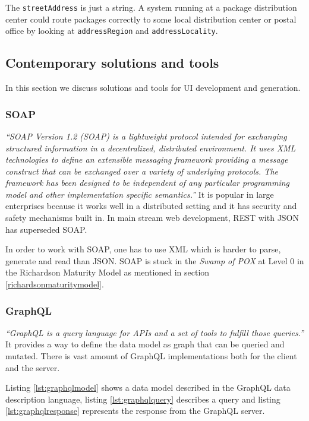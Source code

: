 The \lstinline{streetAddress} is just a string. A system running at a package distribution center could route packages correctly to some local distribution center or postal office by looking at \lstinline{addressRegion} and \lstinline{addressLocality}.

\subsection{Contemporary solutions and tools}\label{sec:contemporarysolutions}
In this section we discuss solutions and tools for UI development and generation.

\subsubsection{SOAP}\label{sec:soap}
\textit{``SOAP Version 1.2 (SOAP) is a lightweight protocol intended for exchanging structured information in a decentralized, distributed environment. It uses XML technologies to define an extensible messaging framework providing a message construct that can be exchanged over a variety of underlying protocols. The framework has been designed to be independent of any particular programming model and other implementation specific semantics.''} \citep{soap}
It is popular in large enterprises because it works well in a distributed setting and it has security and safety mechanisms built in. In main stream web development, REST with JSON has superseded SOAP.

In order to work with SOAP, one has to use XML which is harder to parse, generate and read than JSON. SOAP is stuck in the \textit{Swamp of POX} at Level 0 in the Richardson Maturity Model as mentioned in section \ref{richardsonmaturitymodel}.

\subsubsection{GraphQL}\label{graphql}
\textit{``GraphQL is a query language for APIs and a set of tools to fulfill those queries.''} \citep{graphql} It provides a way to define the data model as graph that can be queried and mutated. There is vast amount of GraphQL implementations both for the client and the server.

Listing \ref{lst:graphqlmodel} shows a data model described in the GraphQL data description language, listing \ref{lst:graphqlquery} describes a query and listing \ref{lst:graphqlresponse} represents the response from the GraphQL server.

